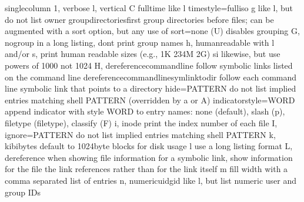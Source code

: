 \documentclass[letterpaper,12pt,english]{sphinxmanual}
\begin{document}
\begin{sphinxVerbatim}[commandchars=\\\{\}]
                               single\PYGZhy{}column \PYGZhy{}1, verbose \PYGZhy{}l, vertical \PYGZhy{}C
      \PYGZhy{}\PYGZhy{}full\PYGZhy{}time            like \PYGZhy{}l \PYGZhy{}\PYGZhy{}time\PYGZhy{}style=full\PYGZhy{}iso
  \PYGZhy{}g                         like \PYGZhy{}l, but do not list owner
      \PYGZhy{}\PYGZhy{}group\PYGZhy{}directories\PYGZhy{}first
                             group directories before files;
                               can be augmented with a \PYGZhy{}\PYGZhy{}sort option, but   any
                               use of \PYGZhy{}\PYGZhy{}sort=none (\PYGZhy{}U) disables grouping
  \PYGZhy{}G, \PYGZhy{}\PYGZhy{}no\PYGZhy{}group             in a long listing, don\PYGZsq{}t print group names
  \PYGZhy{}h, \PYGZhy{}\PYGZhy{}human\PYGZhy{}readable       with \PYGZhy{}l and/or \PYGZhy{}s, print human readable sizes
                               (e.g., 1K 234M 2G)
      \PYGZhy{}\PYGZhy{}si                   likewise, but use powers of 1000 not 1024
  \PYGZhy{}H, \PYGZhy{}\PYGZhy{}dereference\PYGZhy{}command\PYGZhy{}line
                             follow symbolic links listed on the command   line
      \PYGZhy{}\PYGZhy{}dereference\PYGZhy{}command\PYGZhy{}line\PYGZhy{}symlink\PYGZhy{}to\PYGZhy{}dir
                             follow each command line symbolic link
                               that points to a directory
      \PYGZhy{}\PYGZhy{}hide=PATTERN         do not list implied entries matching shell   PATTERN
                               (overridden by \PYGZhy{}a or \PYGZhy{}A)
      \PYGZhy{}\PYGZhy{}indicator\PYGZhy{}style=WORD  append indicator with style WORD to entry   names:
                               none (default), slash (\PYGZhy{}p),
                               file\PYGZhy{}type (\PYGZhy{}\PYGZhy{}file\PYGZhy{}type), classify (\PYGZhy{}F)
  \PYGZhy{}i, \PYGZhy{}\PYGZhy{}inode                print the index number of each file
  \PYGZhy{}I, \PYGZhy{}\PYGZhy{}ignore=PATTERN       do not list implied entries matching shell   PATTERN
  \PYGZhy{}k, \PYGZhy{}\PYGZhy{}kibibytes            default to 1024\PYGZhy{}byte blocks for disk usage
  \PYGZhy{}l                         use a long listing format
  \PYGZhy{}L, \PYGZhy{}\PYGZhy{}dereference          when showing file information for a symbolic
                               link, show information for the file the   link
                               references rather than for the link itself
  \PYGZhy{}m                         fill width with a comma separated list of   entries
  \PYGZhy{}n, \PYGZhy{}\PYGZhy{}numeric\PYGZhy{}uid\PYGZhy{}gid      like \PYGZhy{}l, but list numeric user and group IDs

\end{sphinxVerbatim}
\end{document}
